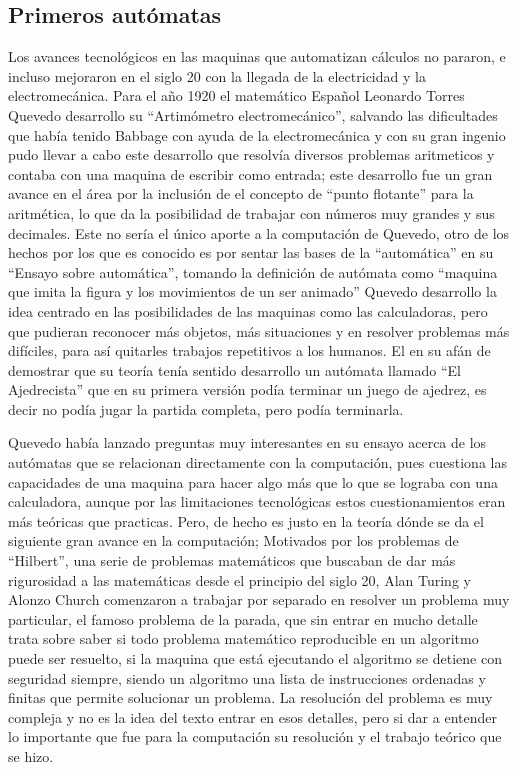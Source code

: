 \documentclass[letterpaper,12pt,oneside]{book}
\begin{document}
		\clearpage		
		
		\subsection{Primeros autómatas}
		
		Los avances tecnológicos en las maquinas que automatizan cálculos no pararon, e incluso mejoraron en el siglo 20 con la llegada de la electricidad
		y la electromecánica. Para el año 1920 el matemático Español Leonardo Torres Quevedo desarrollo su ``Artimómetro electromecánico'', salvando las
		dificultades que había tenido Babbage con ayuda de la electromecánica y con su gran ingenio pudo llevar a cabo este desarrollo que resolvía diversos
		problemas aritmeticos y contaba con una maquina de escribir como entrada; este desarrollo fue un gran avance en el área por la inclusión de
		el concepto de ``punto flotante'' para la aritmética, lo que da la posibilidad de trabajar con números muy grandes
		y sus decimales. Este no sería el único aporte
		a la computación de Quevedo, otro de los hechos por los que es conocido es por sentar las bases de la ``automática'' en su ``Ensayo sobre automática'', tomando
		la definición de autómata como ``maquina que imita la figura y los movimientos de un ser animado'' Quevedo desarrollo la idea centrado en las posibilidades
		de las maquinas como las calculadoras, pero que pudieran reconocer más objetos, más situaciones y en resolver problemas más difíciles, para así
		quitarles trabajos repetitivos a los humanos. El en su afán de demostrar que su teoría tenía sentido desarrollo un autómata llamado
		``El Ajedrecista'' que en su primera versión podía terminar un juego de ajedrez, es decir no podía jugar la partida completa, pero podía terminarla.
		
		Quevedo había lanzado preguntas muy interesantes en su ensayo acerca de los autómatas que se relacionan directamente con la computación, pues cuestiona
		las capacidades de una maquina para hacer algo más que lo que se lograba con una calculadora, aunque por las limitaciones tecnológicas estos cuestionamientos
		eran más teóricas que practicas. Pero, de hecho es justo en la teoría dónde se da el siguiente gran avance en la computación; Motivados por los problemas
		de ``Hilbert'', una serie de problemas matemáticos que buscaban de dar más rigurosidad a las matemáticas desde el principio del siglo 20, Alan Turing
		y Alonzo Church comenzaron a trabajar por separado en resolver un problema muy particular, el famoso problema de la parada, que sin entrar en mucho
		detalle trata sobre saber si todo problema matemático reproducible en un algoritmo puede ser resuelto, si la maquina que está ejecutando el algoritmo
		se detiene con seguridad siempre, siendo un algoritmo una lista de instrucciones ordenadas y finitas que permite solucionar un problema. La resolución
		del problema es muy compleja y no es la idea del texto entrar en esos detalles, pero si dar a entender lo importante que fue para la computación su resolución
		y el trabajo teórico que se hizo.
		
\end{document}
